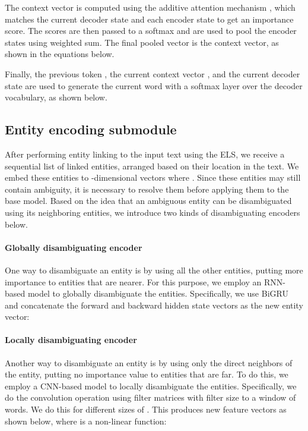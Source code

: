\documentclass[11pt,a4paper]{article}
\begin{document}
The context vector  is computed using the additive attention mechanism \cite{bahdanau2014neural}, which matches the current decoder state  and each encoder state  to get an importance score. The scores are then passed to a softmax and are used to pool the encoder states using weighted sum. The final pooled vector is the context vector, as shown in the equations below.


Finally, the previous token , the current context vector , and the current decoder state  are used to generate the current word  with a softmax layer over the decoder vocabulary, as shown below.


\subsection{Entity encoding submodule}

After performing entity linking to the input text using the ELS, we receive a sequential list of linked entities, arranged based on their location in the text. We embed these entities to -dimensional vectors  where . Since these entities may still contain ambiguity, it is necessary to resolve them before applying them to the base model. Based on the idea that an ambiguous entity can be disambiguated using its neighboring entities, we introduce two kinds of disambiguating encoders below.


\paragraph{Globally disambiguating encoder}

One way to disambiguate an entity is by using all the other entities, putting more importance to entities that are nearer. For this purpose, we employ an RNN-based model to globally disambiguate the entities. Specifically, we use BiGRU and concatenate the forward and backward hidden state vectors as the new entity vector:


\paragraph{Locally disambiguating encoder}

Another way to disambiguate an entity is by using only the direct neighbors of the entity, putting no importance value to entities that are far. To do this, we employ a CNN-based model to locally disambiguate the entities. Specifically, we do the convolution operation using filter matrices  with filter size  to a window of  words. We do this for different sizes of . This produces new feature vectors  as shown below, where  is a non-linear function:
\end{document}

